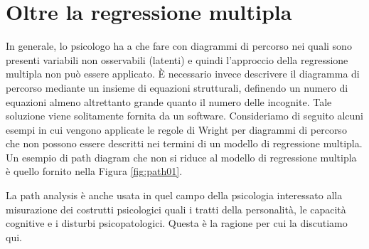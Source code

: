 \documentclass[
  11pt,
]{krantz}
\theoremstyle{definition}
\theoremstyle{definition}
\theoremstyle{definition}
\theoremstyle{definition}
\theoremstyle{remark}
\begin{document}
\hypertarget{oltre-la-regressione-multipla}{%
\section{Oltre la regressione multipla}\label{oltre-la-regressione-multipla}}

In generale, lo psicologo ha a che fare con diagrammi di percorso nei quali sono presenti variabili non osservabili (latenti) e quindi l'approccio della regressione multipla non può essere applicato. È necessario invece descrivere il diagramma di percorso mediante un insieme di equazioni strutturali, definendo un numero di equazioni almeno altrettanto grande quanto il numero delle incognite. Tale soluzione viene solitamente fornita da un software. Consideriamo di seguito alcuni esempi in cui vengono applicate le regole di Wright per diagrammi di percorso che non possono essere descritti nei termini di un modello di regressione multipla. Un esempio di path diagram che non si riduce al modello di regressione multipla è quello fornito nella Figura \ref{fig:path01}.

La path analysis è anche usata in quel campo della psicologia interessato alla misurazione dei costrutti psicologici quali i tratti della personalità, le capacità cognitive e i disturbi psicopatologici. Questa è la ragione per cui la discutiamo qui.
\end{document}
